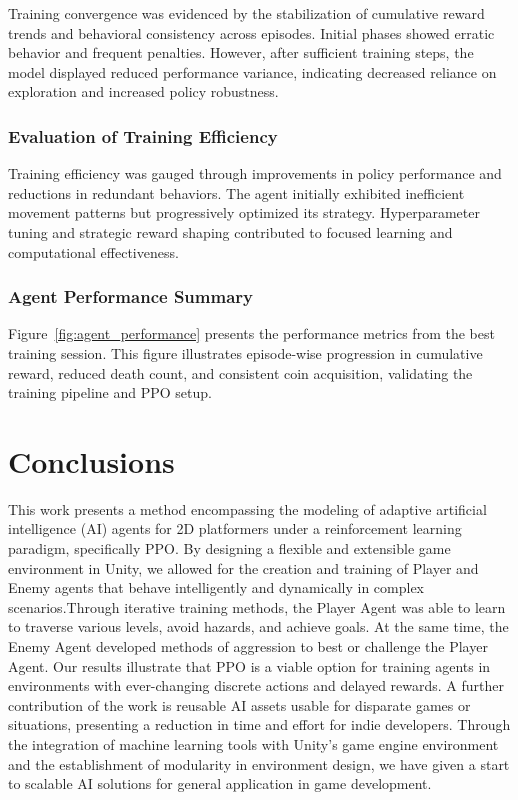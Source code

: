 \documentclass[12pt,oneside,openright,a4paper]{cpe-english-project}
\begin{document}
Training convergence was evidenced by the stabilization of cumulative reward trends and behavioral consistency across episodes. Initial phases showed erratic behavior and frequent penalties. However, after sufficient training steps, the model displayed reduced performance variance, indicating decreased reliance on exploration and increased policy robustness.

\subsection{Evaluation of Training Efficiency}

Training efficiency was gauged through improvements in policy performance and reductions in redundant behaviors. The agent initially exhibited inefficient movement patterns but progressively optimized its strategy. Hyperparameter tuning and strategic reward shaping contributed to focused learning and computational effectiveness.

\subsection{Agent Performance Summary}

Figure~\ref{fig:agent_performance} presents the performance metrics from the best training session. This figure illustrates episode-wise progression in cumulative reward, reduced death count, and consistent coin acquisition, validating the training pipeline and PPO setup.

\chapter{Conclusions}
This work presents a method encompassing the modeling of adaptive artificial intelligence (AI) agents for 2D platformers under a reinforcement learning paradigm, specifically PPO. By designing a flexible and extensible game environment in Unity, we allowed for the creation and training of Player and Enemy agents that behave intelligently and dynamically in complex scenarios.Through iterative training methods, the Player Agent was able to learn to traverse various levels, avoid hazards, and achieve goals. At the same time, the Enemy Agent developed methods of aggression to best or challenge the Player Agent. Our results illustrate that PPO is a viable option for training agents in environments with ever-changing discrete actions and delayed rewards. A further contribution of the work is reusable AI assets usable for disparate games or situations, presenting a reduction in time and effort for indie developers. Through the integration of machine learning tools with Unity's game engine environment and the establishment of modularity in environment design, we have given a start to scalable AI solutions for general application in game development.
\end{document}
